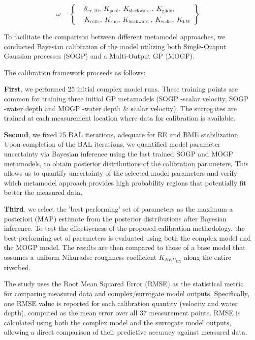 \documentclass[draft,linenumbers,onecolumn]{agujournal2019} %
\begin{document}
\begin{equation}
	\omega = \left\{
	\begin{split}
		&\theta_{cr,10},\ K_{\text{pool}},\ K_{\text{slackwater}},\ K_{\text{glide}}, \\
		&K_{\text{riffle}},\ K_{\text{run}},\ K_{\text{backwater}},\ K_{\text{wake}},\ K_{\text{LW}}
	\end{split}
	\right\}
\end{equation}



To facilitate the comparison between different metamodel approaches, we conducted Bayesian calibration of the model utilizing both Single-Output Gaussian processes (SOGP) and a Multi-Output GP (MOGP).

The calibration framework proceeds as follows:

\textbf{First}, we performed 25 initial complex model runs. These training points are common for training three initial GP metamodels (SOGP -scalar velocity, SOGP -water depth and MOGP -water depth \& scalar velocity). The surrogates are trained at each measurement location where data for calibration is available.

\textbf{Second}, we fixed 75 BAL iterations, adequate for RE and BME stabilization. Upon completion of the BAL iterations, we quantified model parameter uncertainty via Bayesian inference using the last trained SOGP and MOGP metamodels,  to obtain posterior distributions of the calibration parameters. This allows us to quantify uncertainty of the selected model parameters and verify which metamodel approach provides high probability regions that potentially fit better the measured data. 

\textbf{Third}, we select the 'best performing' set of parameters as the maximum a posteriori (MAP) estimate from the posterior distributions after Bayesian inference. To test the effectiveness of the proposed calibration methodology, the best-performing set of parameters is evaluated using both the complex model and the MOGP model. The results are then compared to those of a base model that assumes a uniform Nikuradse roughness coefficient $K_{NKU_{UN}}$ along the entire riverbed. 

The study uses the Root Mean Squared Error (RMSE) as the statistical metric for comparing measured data and complex/surrogate model outputs. Specifically, one RMSE value is reported for each calibration quantity (velocity and water depth), computed as the mean error over all 37 measurement points. RMSE is calculated using both the complex model and the surrogate model outputs, allowing a direct comparison of their predictive accuracy against measured data.
\end{document}
